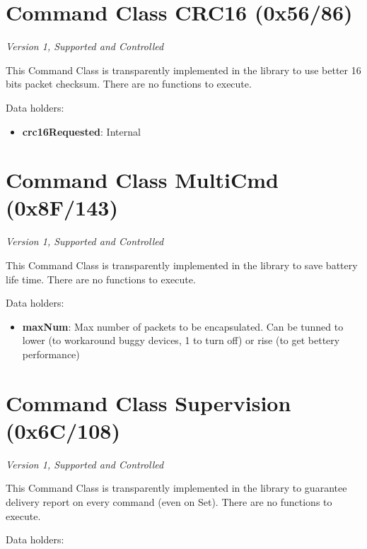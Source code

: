\section{Command Class CRC16 (0x56/86)}

\textit{Version 1, Supported and Controlled}
\newline

This Command Class is transparently implemented in the library to use better 16 bits packet checksum. There are no functions to execute.
\newline

\noindent
Data holders:

\begin{itemize}
\item \textbf{crc16Requested}: Internal
\end{itemize}


\section{Command Class MultiCmd (0x8F/143)}

\textit{Version 1, Supported and Controlled}
\newline

This Command Class is transparently implemented in the library to save battery life time. There are no functions to execute.
\newline

\noindent
Data holders:

\begin{itemize}
\item \textbf{maxNum}: Max number of packets to be encapsulated. Can be tunned to lower (to workaround buggy devices, 1 to turn off) or rise (to get bettery performance)
\end{itemize}


\section{Command Class Supervision (0x6C/108)}

\textit{Version 1, Supported and Controlled}
\newline

This Command Class is transparently implemented in the library to guarantee delivery report on every command (even on Set). There are no functions to execute.
\newline

\noindent
Data holders:

